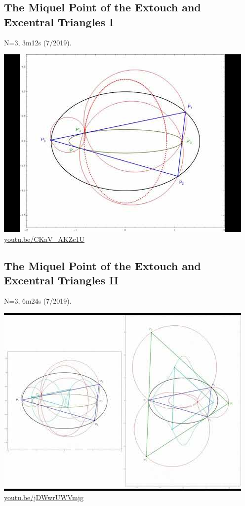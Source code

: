 \documentclass[12pt]{amsart}
\begin{document}
\subsection{The Miquel Point of the Extouch and Excentral Triangles I}
\label{vid:CKaV_AKZc1U}
\noindent N=3, 3m12s (7/2019). 
\begin{center}\includegraphics[width=.5\textwidth]{pics/CKaV_AKZc1U.jpg} \\ 
\href{https://youtu.be/CKaV_AKZc1U}{\url{youtu.be/CKaV\_AKZc1U}}\end{center}
% 

\subsection{The Miquel Point of the Extouch and Excentral Triangles II}
\label{vid:jDWwrUWVmjg}
\noindent N=3, 6m24s (7/2019). 
\begin{center}\includegraphics[width=.5\textwidth]{pics/jDWwrUWVmjg.jpg} \\ 
\href{https://youtu.be/jDWwrUWVmjg}{\url{youtu.be/jDWwrUWVmjg}}\end{center}
% 
\end{document}
